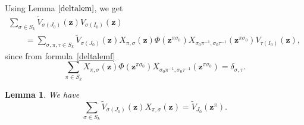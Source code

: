 \documentclass[pdftex]{sigma}
\numberwithin{equation}{section}
\newtheorem{Lemma}[Theorem]{Lemma}
\begin{document}
Using Lemma $\ref{deltalem}$, we get{\samepage
\begin{gather}
\sum_{\sigma\in S_k} \widetilde{V}_{\sigma(J_0)}(\boldsymbol{z}) V_{\sigma(I_0)}(\boldsymbol{z} ) \nonumber\\
\qquad{}=\sum_{\sigma,\pi,\tau\in S_k} \widetilde{V}_{\sigma(J_0)}(\boldsymbol{z})X_{\pi,\sigma}(\boldsymbol{z}) \Phi(\boldsymbol{z}^{\pi\sigma_0})X_{\sigma_0\pi^{-1},\sigma_0\tau^{-1}}(\boldsymbol{z}^{\pi\sigma_0})V_{\tau(I_0)}(\boldsymbol{z}),\label{longeq}
\end{gather}}%
since from formula~\eqref{deltalemf}
\begin{equation*}
\sum_{\pi\in S_k} X_{\pi,\sigma}(\boldsymbol{z}) \Phi(\boldsymbol{z}^{\pi\sigma_0})X_{\sigma_0\pi^{-1},\sigma_0\tau^{-1}}(\boldsymbol{z}^{\pi\sigma_0}) =\delta_{\sigma,\tau}.
\end{equation*}
\begin{Lemma}\label{sum1} We have
\begin{equation}\label{sumvx}
\sum_{\sigma\in S_k} \widetilde{V}_{\sigma(J_0)}(\boldsymbol{z})X_{\pi,\sigma}(\boldsymbol{z})=\widetilde{V}_{J_0}(\boldsymbol{z}^\pi).
\end{equation}
\end{Lemma}
\end{document}
